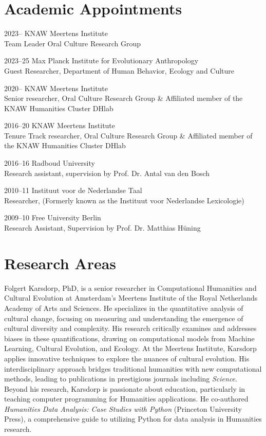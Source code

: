 \documentclass[12pt,letterpaper]{report}
\begin{document}
\section*{Academic Appointments}
\begin{tablist}
\item[2023--]   \tab{}KNAW Meertens Institute \\
  Team Leader Oral Culture Research Group
\item[2023--25]   \tab{}Max Planck Institute for Evolutionary Anthropology \\
  Guest Researcher, Department of Human Behavior, Ecology and Culture
\item[2020--]   \tab{}KNAW Meertens Institute \\
  Senior researcher, Oral Culture Research Group \& Affiliated member of the KNAW Humanities
  Cluster DHlab

\item[2016--20] \tab{}KNAW Meertens Institute \\
  Tenure Track researcher, Oral Culture Research Group \& Affiliated member of the KNAW
  Humanities Cluster DHlab

\item[2016--16] \tab{}Radboud University \\
  Research assistant, supervision by Prof. Dr. Antal van den Bosch

\item[2010--11] \tab{}Instituut voor de Nederlandse Taal \\
  Researcher, (Formerly known as the Instituut voor Nederlandse Lexicologie)

\item[2009--10] \tab{}Free University Berlin \\
  Research Assistant, Supervision by Prof. Dr. Matthias Hüning
\end{tablist}

\section*{Research Areas}

Folgert Karsdorp, PhD, is a senior researcher in Computational Humanities and
Cultural Evolution at Amsterdam’s Meertens Institute of the Royal Netherlands
Academy of Arts and Sciences. He specializes in the quantitative analysis of
cultural change, focusing on measuring and understanding the emergence of
cultural diversity and complexity. His research critically examines and
addresses biases in these quantifications, drawing on computational models from
Machine Learning, Cultural Evolution, and Ecology. At the Meertens Institute,
Karsdorp applies innovative techniques to explore the nuances of cultural
evolution. His interdisciplinary approach bridges traditional humanities with
new computational methods, leading to publications in prestigious journals
including \emph{Science}. Beyond his research, Karsdorp is passionate about
education, particularly in teaching computer programming for Humanities
applications. He co-authored \emph{Humanities Data Analysis: Case Studies with
  Python} (Princeton University Press), a comprehensive guide to utilizing
Python for data analysis in Humanities research.
\end{document}
